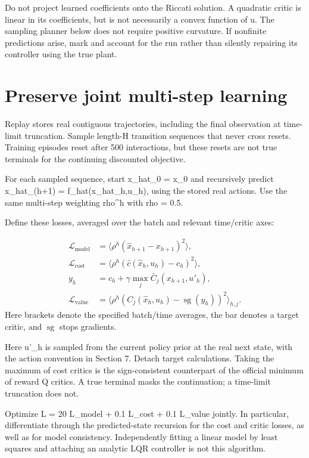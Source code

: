 \documentclass[11pt]{article}
\begin{document}
Do not project learned coefficients onto the Riccati solution. A quadratic critic is linear in its coefficients, but is not necessarily a convex function of u. The sampling planner below does not require positive curvature. If nonfinite predictions arise, mark and account for the run rather than silently repairing its controller using the true plant.

\section{Preserve joint multi-step learning}

Replay stores real contiguous trajectories, including the final observation at time-limit truncation. Sample length-H transition sequences that never cross resets. Training episodes reset after 500 interactions, but these resets are not true terminals for the continuing discounted objective.

For each sampled sequence, start x\_hat\_0 = x\_0 and recursively predict x\_hat\_(h+1) = f\_hat(x\_hat\_h,u\_h), using the stored real actions. Use the same multi-step weighting rho\textasciicircum{}h with rho = 0.5.

Define these losses, averaged over the batch and relevant time/critic axes:

\begin{align}
\mathcal L_{\mathrm{model}} &= \langle\rho^h(\hat x_{h+1}-x_{h+1})^2\rangle,\\
\mathcal L_{\mathrm{cost}} &= \langle\rho^h(\hat c(\hat x_h,u_h)-c_h)^2\rangle,\\
y_h &= c_h+\gamma\max_{j}\bar C_j(x_{h+1},u'_h),\\
\mathcal L_{\mathrm{value}} &= \langle\rho^h(C_j(\hat x_h,u_h)-\operatorname{sg}(y_h))^2\rangle_{h,j}.
\end{align}
Here brackets denote the specified batch/time averages, the bar denotes a target critic, and $\operatorname{sg}$ stops gradients.

Here u'\_h is sampled from the current policy prior at the real next state, with the action convention in Section 7. Detach target calculations. Taking the maximum of cost critics is the sign-consistent counterpart of the official minimum of reward Q critics. A true terminal masks the continuation; a time-limit truncation does not.

Optimize L = 20 L\_model + 0.1 L\_cost + 0.1 L\_value jointly. In particular, differentiate through the predicted-state recursion for the cost and critic losses, as well as for model consistency. Independently fitting a linear model by least squares and attaching an analytic LQR controller is not this algorithm.
\end{document}
